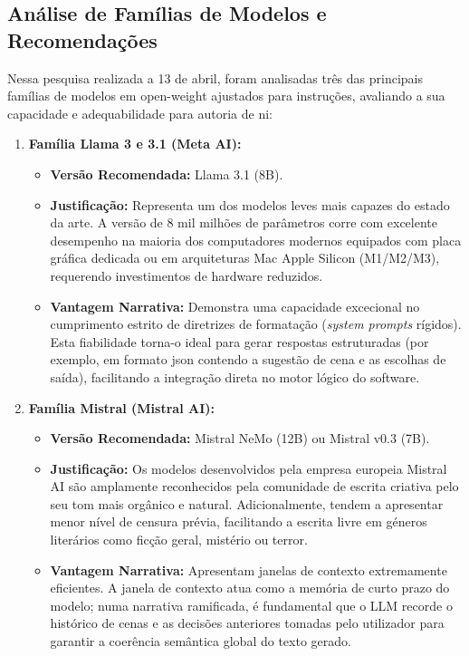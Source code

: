 \subsection{Análise de Famílias de Modelos e Recomendações}
Nessa pesquisa realizada a 13 de abril, foram analisadas três das principais famílias de modelos em open-weight ajustados para instruções, avaliando a sua capacidade e adequabilidade para autoria de \gls{ni}:

\begin{enumerate}
    \item \textbf{Família Llama 3 e 3.1 (Meta AI):}
    \begin{itemize}
        \item \textbf{Versão Recomendada:} Llama 3.1 (8B).
        \item \textbf{Justificação:} Representa um dos modelos leves mais capazes do estado da arte. A versão de 8 mil milhões de parâmetros corre com excelente desempenho na maioria dos computadores modernos equipados com placa gráfica dedicada ou em arquiteturas Mac Apple Silicon (M1/M2/M3), requerendo investimentos de hardware reduzidos.
        \item \textbf{Vantagem Narrativa:} Demonstra uma capacidade excecional no cumprimento estrito de diretrizes de formatação (\textit{system prompts} rígidos). Esta fiabilidade torna-o ideal para gerar respostas estruturadas (por exemplo, em formato \gls{json} contendo a sugestão de cena e as escolhas de saída), facilitando a integração direta no motor lógico do software.
    \end{itemize}

    \item \textbf{Família Mistral (Mistral AI):}
    \begin{itemize}
        \item \textbf{Versão Recomendada:} Mistral NeMo (12B) ou Mistral v0.3 (7B).
        \item \textbf{Justificação:} Os modelos desenvolvidos pela empresa europeia Mistral AI são amplamente reconhecidos pela comunidade de escrita criativa pelo seu tom mais orgânico e natural. Adicionalmente, tendem a apresentar menor nível de censura prévia, facilitando a escrita livre em géneros literários como ficção geral, mistério ou terror.
        \item \textbf{Vantagem Narrativa:} Apresentam janelas de contexto extremamente eficientes. A janela de contexto atua como a memória de curto prazo do modelo; numa narrativa ramificada, é fundamental que o LLM recorde o histórico de cenas e as decisões anteriores tomadas pelo utilizador para garantir a coerência semântica global do texto gerado.
    \end{itemize}


\end{enumerate}
